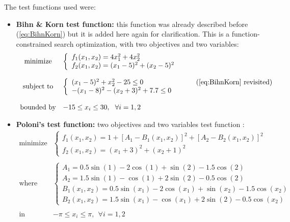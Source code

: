 \newpage

The test functions used were:
\begin{itemize}
\item \textbf{Bihn \& Korn test function:} this function was already described before (\ref{eq:BihnKorn}) but it is added here again for clarification. This is a function-constrained search optimization, with two objectives and two variables:
    \begin{equation}
        \begin{array}{cl}
            \textrm{minimize} & 
            \left\{ \begin{array}{l}
                f_1(x_1,x_2) = 4x_1^2 + 4x_2^2\\
                f_2(x_1,x_2) = (x_1-5)^2+(x_2-5)^2
            \end{array} \right. \\
            & \\
            \textrm{subject to} &  
            \left\{ \begin{array}{l}
                (x_1-5)^2+x_2^2-25 \leq 0\\
                -(x_1-8)^2-(x_2+3)^2 + 7.7 \leq 0
            \end{array} \right. \\
            & \\
            \textrm{bounded by} & -15 \leq x_i \leq 30, \ \ \forall i = 1,2
        \end{array}
        \tag{\ref{eq:BihnKorn} revisited}
    \end{equation}

\item \textbf{Poloni's test function:} two objectives and two variables test function \cite{poloni1995hybrid}:
    \begin{equation}
\begin{array}{cl}
            \textrm{minimize} & 
            \left\{ \begin{array}{l}
                f_1(x_1,x_2) = 1+\left[A_1-B_1(x_1,x_2)\right]^2+\left[A_2-B_2(x_1,x_2)\right]^2\\
                f_2(x_1,x_2) = (x_1+3)^2+(x_2+1)^2
            \end{array} \right. \\
            & \\
            \textrm{where} & 
            \left\{ \begin{array}{l}
                A_1 = 0.5\sin(1)-2\cos(1)+\sin(2)-1.5\cos(2) \\
                A_2 = 1.5\sin(1)-\cos(1)+2\sin(2)-0.5\cos(2) \\
                B_1(x_1,x_2) = 0.5\sin(x_1)-2\cos(x_1)+\sin(x_2)-1.5\cos(x_2) \\
                B_2(x_1,x_2) = 1.5\sin(x_1)-\cos(x_1)+2\sin(2)-0.5\cos(x_2)
            \end{array} \right. \\
            & \\
            \textrm{in} & -\pi \leq x_i \leq \pi, \ \ \forall i = 1,2
        \end{array}
        \label{eq:poloni}
    \end{equation}


\end{itemize}

